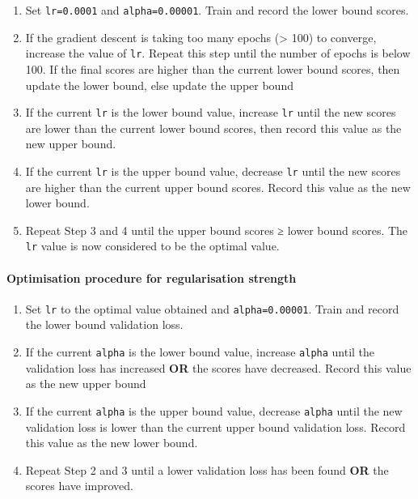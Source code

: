 \documentclass[11pt]{article}
\begin{document}
\begin{enumerate}
\def\labelenumi{\arabic{enumi}.}
\item
  Set \texttt{lr=0.0001} and \texttt{alpha=0.00001}. Train and record
  the lower bound scores.
\item
  If the gradient descent is taking too many epochs (\textgreater{} 100)
  to converge, increase the value of \texttt{lr}. Repeat this step until
  the number of epochs is below 100. If the final scores are higher than
  the current lower bound scores, then update the lower bound, else
  update the upper bound
\item
  If the current \texttt{lr} is the lower bound value, increase
  \texttt{lr} until the new scores are lower than the current lower
  bound scores, then record this value as the new upper bound.
\item
  If the current \texttt{lr} is the upper bound value, decrease
  \texttt{lr} until the new scores are higher than the current upper
  bound scores. Record this value as the new lower bound.
\item
  Repeat Step 3 and 4 until the upper bound scores ≥ lower bound scores.
  The \texttt{lr} value is now considered to be the optimal value.
\end{enumerate}

\hypertarget{optimisation-procedure-for-regularisation-strength}{%
\paragraph{Optimisation procedure for regularisation
strength}\label{optimisation-procedure-for-regularisation-strength}}

\begin{enumerate}
\def\labelenumi{\arabic{enumi}.}
\item
  Set \texttt{lr} to the optimal value obtained and
  \texttt{alpha=0.00001}. Train and record the lower bound validation
  loss.
\item
  If the current \texttt{alpha} is the lower bound value, increase
  \texttt{alpha} until the validation loss has increased \textbf{OR} the
  scores have decreased. Record this value as the new upper bound
\item
  If the current \texttt{alpha} is the upper bound value, decrease
  \texttt{alpha} until the new validation loss is lower than the current
  upper bound validation loss. Record this value as the new lower bound.
\item
  Repeat Step 2 and 3 until a lower validation loss has been found
  \textbf{OR} the scores have improved.
\end{enumerate}
\end{document}
